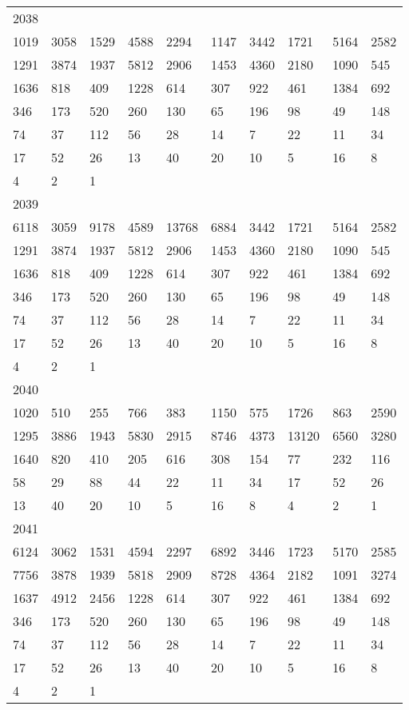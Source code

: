 \begin{longtable}{*{10}{l}}
2038&&&&&&&&&\\
1019& 3058& 1529& 4588& 2294& 1147& 3442& 1721& 5164& 2582\\
1291& 3874& 1937& 5812& 2906& 1453& 4360& 2180& 1090& 545\\
1636& 818& 409& 1228& 614& 307& 922& 461& 1384& 692\\
346& 173& 520& 260& 130& 65& 196& 98& 49& 148\\
74& 37& 112& 56& 28& 14& 7& 22& 11& 34\\
17& 52& 26& 13& 40& 20& 10& 5& 16& 8\\
4& 2& 1& \\

2039&&&&&&&&&\\
6118& 3059& 9178& 4589& 13768& 6884& 3442& 1721& 5164& 2582\\
1291& 3874& 1937& 5812& 2906& 1453& 4360& 2180& 1090& 545\\
1636& 818& 409& 1228& 614& 307& 922& 461& 1384& 692\\
346& 173& 520& 260& 130& 65& 196& 98& 49& 148\\
74& 37& 112& 56& 28& 14& 7& 22& 11& 34\\
17& 52& 26& 13& 40& 20& 10& 5& 16& 8\\
4& 2& 1& \\

2040&&&&&&&&&\\
1020& 510& 255& 766& 383& 1150& 575& 1726& 863& 2590\\
1295& 3886& 1943& 5830& 2915& 8746& 4373& 13120& 6560& 3280\\
1640& 820& 410& 205& 616& 308& 154& 77& 232& 116\\
58& 29& 88& 44& 22& 11& 34& 17& 52& 26\\
13& 40& 20& 10& 5& 16& 8& 4& 2& 1\\

2041&&&&&&&&&\\
6124& 3062& 1531& 4594& 2297& 6892& 3446& 1723& 5170& 2585\\
7756& 3878& 1939& 5818& 2909& 8728& 4364& 2182& 1091& 3274\\
1637& 4912& 2456& 1228& 614& 307& 922& 461& 1384& 692\\
346& 173& 520& 260& 130& 65& 196& 98& 49& 148\\
74& 37& 112& 56& 28& 14& 7& 22& 11& 34\\
17& 52& 26& 13& 40& 20& 10& 5& 16& 8\\
4& 2& 1& \\


\end{longtable}
